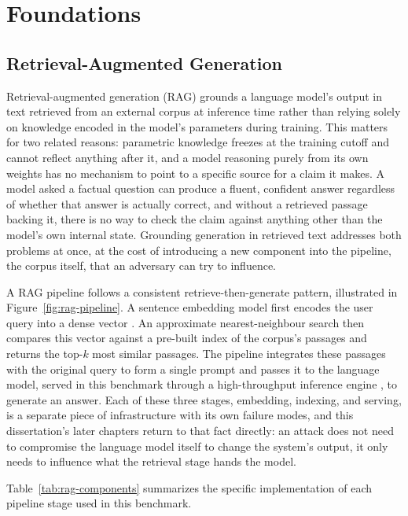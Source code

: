 \chapter{Foundations}

\section{Retrieval-Augmented Generation}

Retrieval-augmented generation (RAG) grounds a language model's output
in text retrieved from an external corpus at inference time rather than
relying solely on knowledge encoded in the model's parameters during
training. This matters for two related reasons: parametric knowledge
freezes at the training cutoff and cannot reflect anything after it, and
a model reasoning purely from its own weights has no mechanism to point
to a specific source for a claim it makes. A model asked a factual
question can produce a fluent, confident answer regardless of whether
that answer is actually correct, and without a retrieved passage backing
it, there is no way to check the claim against anything other than the
model's own internal state. Grounding generation in retrieved text
addresses both problems at once, at the cost of introducing a new
component into the pipeline, the corpus itself, that an adversary can
try to influence.

A RAG pipeline follows a consistent retrieve-then-generate pattern,
illustrated in Figure~\ref{fig:rag-pipeline}. A sentence embedding model
first encodes the user query into a dense vector
\cite{reimers2019sentencebert,song2020mpnet}. An approximate
nearest-neighbour search then compares this vector against a pre-built
index of the corpus's passages \cite{johnson2021billionscale} and
returns the top-\(k\) most similar passages. The pipeline integrates
these passages with the original query to form a single prompt and
passes it to the language model, served in this benchmark through a
high-throughput inference engine \cite{kwon2023efficient}, to generate
an answer. Each of these three stages, embedding, indexing, and serving,
is a separate piece of infrastructure with its own failure modes, and
this dissertation's later chapters return to that fact directly: an
attack does not need to compromise the language model itself to change
the system's output, it only needs to influence what the retrieval stage
hands the model.

Table~\ref{tab:rag-components} summarizes the specific implementation of
each pipeline stage used in this benchmark.

